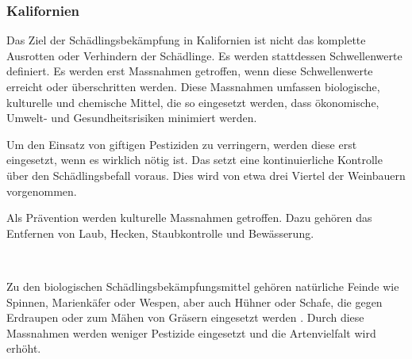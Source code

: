 \subsubsection{Kalifornien}
\label{sub:sch_dlingsbek_mpfung}

Das Ziel der Schädlingsbekämpfung in Kalifornien ist nicht das komplette Ausrotten oder Verhindern
der Schädlinge. Es werden stattdessen Schwellenwerte definiert. Es werden erst Massnahmen getroffen,
wenn diese Schwellenwerte erreicht oder überschritten werden. Diese Massnahmen umfassen biologische,
kulturelle und chemische Mittel, die so eingesetzt werden, dass ökonomische, Umwelt- und
Gesundheitsrisiken minimiert werden.

Um den Einsatz von giftigen Pestiziden zu verringern, werden diese erst eingesetzt, wenn es wirklich
nötig ist. Das setzt eine kontinuierliche Kontrolle über den Schädlingsbefall voraus. Dies wird von
etwa drei Viertel der Weinbauern vorgenommen.

Als Prävention werden kulturelle Massnahmen getroffen. Dazu gehören das Entfernen von Laub, Hecken,
Staubkontrolle und Bewässerung.

\cite{_2015_cswa_sustainability_report.pdf}\\
\cite{_2015_report_appendix.pdf}


Zu den biologischen Schädlingsbekämpfungsmittel gehören natürliche Feinde wie Spinnen, Marienkäfer
oder Wespen, aber auch Hühner oder Schafe, die gegen Erdraupen oder zum Mähen von Gräsern eingesetzt
werden \cite{_sustainable}.  Durch diese Massnahmen werden weniger
Pestizide eingesetzt und die Artenvielfalt wird erhöht.